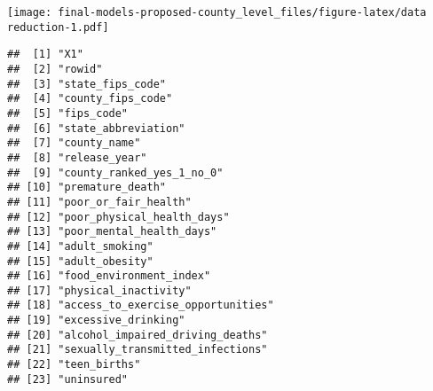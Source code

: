 \documentclass[
]{article}
\newenvironment{Shaded}{\begin{snugshade}}{\end{snugshade}}
\newcommand{\FloatTok}[1]{\textcolor[rgb]{0.00,0.00,0.81}{#1}}
\newcommand{\KeywordTok}[1]{\textcolor[rgb]{0.13,0.29,0.53}{\textbf{#1}}}
\newcommand{\NormalTok}[1]{#1}
\newcommand{\OperatorTok}[1]{\textcolor[rgb]{0.81,0.36,0.00}{\textbf{#1}}}
\newcommand{\StringTok}[1]{\textcolor[rgb]{0.31,0.60,0.02}{#1}}
\begin{document}
\texttt{[image: final-models-proposed-county\_level\_files/figure-latex/data reduction-1.pdf]}

\begin{Shaded}
\end{Shaded}

\begin{verbatim}
##  [1] "X1"                                                                 
##  [2] "rowid"                                                              
##  [3] "state_fips_code"                                                    
##  [4] "county_fips_code"                                                   
##  [5] "fips_code"                                                          
##  [6] "state_abbreviation"                                                 
##  [7] "county_name"                                                        
##  [8] "release_year"                                                       
##  [9] "county_ranked_yes_1_no_0"                                           
## [10] "premature_death"                                                    
## [11] "poor_or_fair_health"                                                
## [12] "poor_physical_health_days"                                          
## [13] "poor_mental_health_days"                                            
## [14] "adult_smoking"                                                      
## [15] "adult_obesity"                                                      
## [16] "food_environment_index"                                             
## [17] "physical_inactivity"                                                
## [18] "access_to_exercise_opportunities"                                   
## [19] "excessive_drinking"                                                 
## [20] "alcohol_impaired_driving_deaths"                                    
## [21] "sexually_transmitted_infections"                                    
## [22] "teen_births"                                                        
## [23] "uninsured"                                                          

\end{verbatim}
\end{document}
